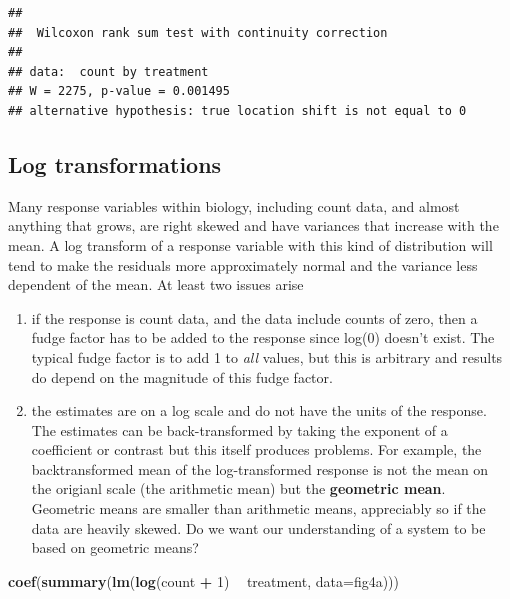 \documentclass[]{book}
\newenvironment{Shaded}{\begin{snugshade}}{\end{snugshade}}
\newcommand{\KeywordTok}[1]{\textcolor[rgb]{0.13,0.29,0.53}{\textbf{#1}}}
\newcommand{\DataTypeTok}[1]{\textcolor[rgb]{0.13,0.29,0.53}{#1}}
\newcommand{\DecValTok}[1]{\textcolor[rgb]{0.00,0.00,0.81}{#1}}
\newcommand{\StringTok}[1]{\textcolor[rgb]{0.31,0.60,0.02}{#1}}
\newcommand{\OperatorTok}[1]{\textcolor[rgb]{0.81,0.36,0.00}{\textbf{#1}}}
\newcommand{\NormalTok}[1]{#1}
\providecommand{\tightlist}{%
  \setlength{\itemsep}{0pt}\setlength{\parskip}{0pt}}
\begin{document}
\begin{verbatim}
## 
##  Wilcoxon rank sum test with continuity correction
## 
## data:  count by treatment
## W = 2275, p-value = 0.001495
## alternative hypothesis: true location shift is not equal to 0
\end{verbatim}

\subsection{Log transformations}\label{log-transformations}

Many response variables within biology, including count data, and almost
anything that grows, are right skewed and have variances that increase
with the mean. A log transform of a response variable with this kind of
distribution will tend to make the residuals more approximately normal
and the variance less dependent of the mean. At least two issues arise

\begin{enumerate}
\def\labelenumi{\arabic{enumi}.}
\tightlist
\item
  if the response is count data, and the data include counts of zero,
  then a fudge factor has to be added to the response since log(0)
  doesn't exist. The typical fudge factor is to add 1 to \emph{all}
  values, but this is arbitrary and results do depend on the magnitude
  of this fudge factor.
\item
  the estimates are on a log scale and do not have the units of the
  response. The estimates can be back-transformed by taking the exponent
  of a coefficient or contrast but this itself produces problems. For
  example, the backtransformed mean of the log-transformed response is
  not the mean on the origianl scale (the arithmetic mean) but the
  \textbf{geometric mean}. Geometric means are smaller than arithmetic
  means, appreciably so if the data are heavily skewed. Do we want our
  understanding of a system to be based on geometric means?
\end{enumerate}

\begin{Shaded}
\begin{Highlighting}[]
\KeywordTok{coef}\NormalTok{(}\KeywordTok{summary}\NormalTok{(}\KeywordTok{lm}\NormalTok{(}\KeywordTok{log}\NormalTok{(count }\OperatorTok{+}\StringTok{ }\DecValTok{1}\NormalTok{) }\OperatorTok{~}\StringTok{ }\NormalTok{treatment, }\DataTypeTok{data=}\NormalTok{fig4a)))}
\end{Highlighting}
\end{Shaded}
\end{document}
